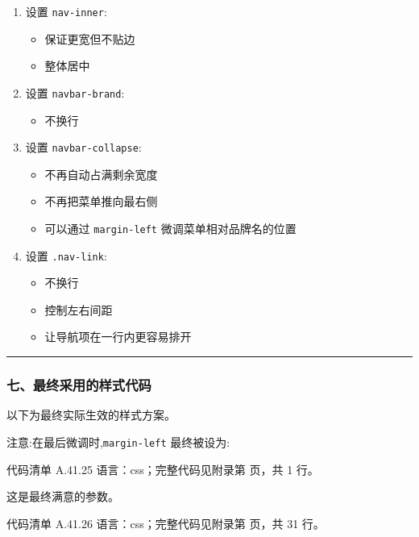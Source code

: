 \documentclass[lang=cn,scheme=chinese,color=blue,device=normal,toc=onecol,math=cm]{elegantbook}
\begin{document}
\begin{enumerate}
\item 设置 \texttt{nav-inner}: 
\begin{itemize}
\item 保证更宽但不贴边
\item 整体居中
\end{itemize}
\item 设置 \texttt{navbar-brand}: 
\begin{itemize}
\item 不换行
\end{itemize}
\item 设置 \texttt{navbar-collapse}: 
\begin{itemize}
\item 不再自动占满剩余宽度
\item 不再把菜单推向最右侧
\item 可以通过 \texttt{margin-left} 微调菜单相对品牌名的位置
\end{itemize}
\item 设置 \texttt{.nav-link}: 
\begin{itemize}
\item 不换行
\item 控制左右间距
\item 让导航项在一行内更容易排开
\end{itemize}
\end{enumerate}


\medskip\hrule\medskip


\subsubsection{七、最终采用的样式代码}


以下为最终实际生效的样式方案。\par


注意:在最后微调时,\texttt{margin-left} 最终被设为:\par


\begin{codeindexbox}{代码清单 A.41.25}
语言：css；完整代码见附录第 \pageref{code:41:25} 页，共 1 行。
\end{codeindexbox}


这是最终满意的参数。\par


\begin{codeindexbox}{代码清单 A.41.26}
语言：css；完整代码见附录第 \pageref{code:41:26} 页，共 31 行。
\end{codeindexbox}
\end{document}
